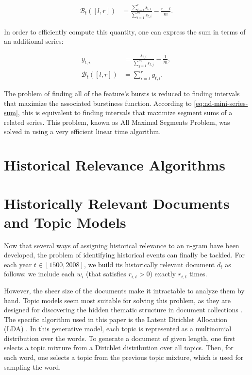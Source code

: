 \begin{align}
\label{eq:nd-time-series-bursty}
\mathcal{B}_{t} \left( \left[ l, r \right] \right) &= \frac{\sum_{i=l}^{r} s_{t,i}}{\sum_{i=1}^{m} s_{t,i}} - \frac{r - l}{m}.
\end{align}

In order to efficiently compute this quantity, one can express the sum in terms of an additional series:

\begin{align}
\label{eq:nd-mini-series}
y_{t,i} &= \frac{s_{t,i}}{\sum_{j=1}^{m} s_{t,j}} - \frac{1}{m}, \\
\label{eq:nd-mini-series-sum}
\mathcal{B}_{t} \left( \left[ l, r \right] \right) &= \sum_{i=l}^{r} y_{t,i}.
\end{align}

The problem of finding all of the feature's bursts is reduced to finding intervals that maximize the associated burstiness function. According to \autoref{eq:nd-mini-series-sum}, this is equivalent to finding intervals that maximize segment sums of a related series. This problem, known as All Maximal Segments Problem, was solved in \cite{Ruzzo99alinear} using a very efficient linear time algorithm.

\section{Historical Relevance Algorithms}
\label{sec:historical-relevance-algorithms}


\section{Historically Relevant Documents and Topic Models}
\label{sec:hist-relevant-doc}

Now that several ways of assigning historical relevance to an n-gram have been developed, the problem of identifying historical events can finally be tackled. For each year $t \in \left[ 1500, 2008 \right]$, we build its historically relevant document $d_t$ as follows: we include each $w_i$ (that satisfies $r_{i, t} > 0$) exactly $r_{i, t}$ times.

However, the sheer size of the documents make it intractable to analyze them by hand. Topic models seem most suitable for solving this problem, as they are designed for discovering the hidden thematic structure in document collections \cite{Blei:2012:PTM:2133806.2133826}. The specific algorithm used in this paper is the Latent Dirichlet Allocation (LDA) \cite{Blei:2003:LDA:944919.944937}. In this generative model, each topic is represented as a multinomial distribution over the words. To generate a document of given length, one first selects a topic mixture from a Dirichlet distribution over all topics. Then, for each word, one selects a topic from the previous topic mixture, which is used for sampling the word.

